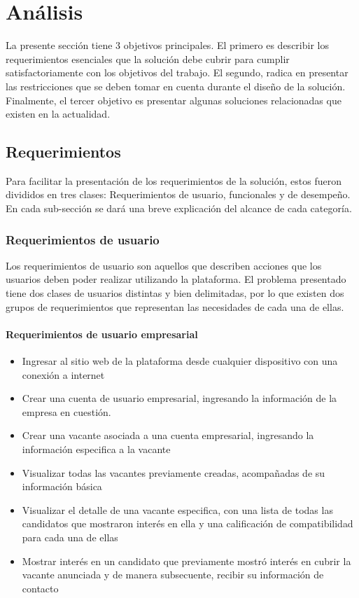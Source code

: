 \chapter{Análisis}
La presente sección tiene 3 objetivos principales. El primero es describir los requerimientos esenciales que la solución debe cubrir para cumplir satisfactoriamente con los objetivos del trabajo. El segundo, radica en presentar las restricciones que se deben tomar en cuenta durante el diseño de la solución. Finalmente, el tercer objetivo es presentar algunas soluciones relacionadas que existen en la actualidad.

\section{Requerimientos}
Para facilitar la presentación de los requerimientos de la solución, estos fueron divididos en tres clases: Requerimientos de usuario, funcionales y de desempeño. En cada sub-sección se dará una breve explicación del alcance de cada categoría.

\subsection{Requerimientos de usuario}
Los requerimientos de usuario son aquellos que describen acciones que los usuarios deben poder realizar utilizando la plataforma.
El problema presentado tiene dos clases de usuarios distintas y bien delimitadas, por lo que existen dos grupos de requerimientos que representan las necesidades de cada una de ellas.
\subsubsection{Requerimientos de usuario empresarial}
\begin{itemize}
  Para que el sistema sea útil para los usuarios empresariales, es imprescindible que puedan realizar las siguientes acciones:
    \item Ingresar al sitio web de la plataforma desde cualquier dispositivo con una conexión a internet
    \item Crear una cuenta de usuario empresarial, ingresando la información de la empresa en cuestión.
    \item Crear una vacante asociada a una cuenta empresarial, ingresando la información especifica a la vacante
    \item Visualizar todas las vacantes previamente creadas, acompañadas de su información básica
    \item Visualizar el detalle de una vacante especifica, con una lista de todas las candidatos que mostraron interés en ella y una calificación de compatibilidad para cada una de ellas
    \item Mostrar interés en un candidato que previamente mostró interés en cubrir la vacante anunciada y de manera subsecuente, recibir su información de contacto
\end{itemize}
